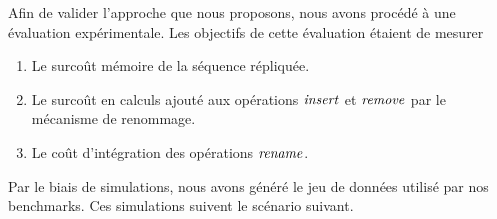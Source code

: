 \label{sec:validation-experimentations}

Afin de valider l'approche que nous proposons, nous avons procédé à une évaluation expérimentale.
Les objectifs de cette évaluation étaient de mesurer
\begin{enumerate}
  \item Le surcoût mémoire de la séquence répliquée.
  \item Le surcoût en calculs ajouté aux opérations $\mathit{insert}$ et $\mathit{remove}$ par le mécanisme de renommage.
  \item Le coût d'intégration des opérations $\mathit{rename}$.
\end{enumerate}

Par le biais de simulations, nous avons généré le jeu de données utilisé par nos benchmarks.
Ces simulations suivent le scénario suivant.
